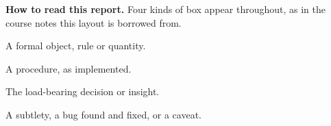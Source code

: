 \documentclass[11pt,openany]{book}
\begin{document}
\textbf{How to read this report.} Four kinds of box appear throughout, as in the
course notes this layout is borrowed from.

\noindent\begin{minipage}[t]{0.485\linewidth}
\begin{defbox}[Definition]
A formal object, rule or quantity.
\end{defbox}
\begin{algbox}[Algorithm]
A procedure, as implemented.
\end{algbox}
\end{minipage}\hfill
\begin{minipage}[t]{0.485\linewidth}
\begin{keybox}
The load-bearing decision or insight.
\end{keybox}
\begin{warnbox}
A subtlety, a bug found and fixed, or a caveat.
\end{warnbox}
\end{minipage}

\clearpage
\pagestyle{plain}
\tableofcontents
\clearpage
\pagestyle{fancy}













\appendix

\end{document}
